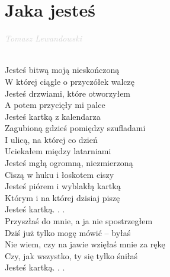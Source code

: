 \documentclass[a5paper, 10pt]{book}
\begin{document}
\newpage
\section{Jaka jesteś}\textcolor{lightgray}{\textit{Tomasz Lewandowski}}\\~\\
\begin{minipage}[t]{0.7\textwidth}
Jesteś bitwą moją nieskończoną\\
W której ciągle o przyczółek walczę\\
Jesteś drzwiami, które otworzyłem\\
A potem przycięły mi palce\\

\hspace*{2mm} Jesteś kartką z kalendarza\\
\hspace*{2mm} Zagubioną gdzieś pomiędzy szufladami\\
\hspace*{2mm} I ulicą, na której co dzień\\
\hspace*{2mm} Uciekałem między latarniami\\

Jesteś mgłą ogromną, niezmierzoną\\
Ciszą w huku i łoskotem ciszy\\
Jesteś piórem i wyblakłą kartką\\
Którym i na której dzisiaj piszę\\

\hspace*{2mm} Jesteś kartką. . .\\

Przyszłaś do mnie, a ja nie spostrzegłem\\
Dziś już tylko mogę mówić – byłaś\\
Nie wiem, czy na jawie wzięłaś mnie za rękę\\
Czy, jak wszystko, ty się tylko śniłaś\\

\hspace*{2mm} Jesteś kartką. . .\\

\end{minipage}
\end{document}
